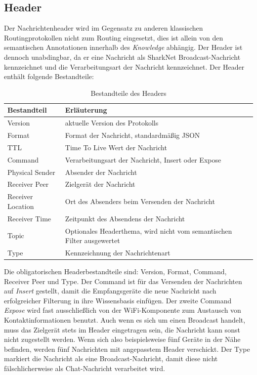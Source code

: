 \subsection{Header}
Der Nachrichtenheader wird im Gegensatz zu anderen klassischen Routingprotokollen nicht zum Routing eingesetzt, dies ist allein von den semantischen Annotationen innerhalb des \textit{Knowledge} abhängig. Der Header ist dennoch unabdingbar, da er eine Nachricht als SharkNet Broadcast-Nachricht kennzeichnet und die Verarbeitungsart der Nachricht kennzeichnet. Der Header enthält folgende Bestandteile:
\begin{table}[H]
	\begin{center}
		\caption{Bestandteile des Headers}
		\label{tab:messageHeader}
		\begin{tabular}{l|l} 			
			Bestandteil & Erläuterung \\
			\hline
			Version & aktuelle Version des Protokolls\\
			Format & Format der Nachricht, standardmäßig JSON\\
			TTL & Time To Live Wert der Nachricht\\
			Command & Verarbeitungsart der Nachricht, Insert oder Expose\\
			Physical Sender & Absender der Nachricht\\
			Receiver Peer & Zielgerät der Nachricht\\
			Receiver Location & Ort des Absenders beim Versenden der Nachricht\\
			Receiver Time & Zeitpunkt des Absendens der Nachricht\\
			Topic & Optionales Headerthema, wird nicht vom semantischen Filter ausgewertet\\
			Type & Kennzeichnung der Nachrichtenart\\							
		\end{tabular}
	\end{center}
\end{table}
Die obligatorischen Headerbestandteile sind: Version, Format, Command, Receiver Peer und Type. Der Command ist für das Versenden der Nachrichten auf \textit{Insert} gestellt, damit die Empfangsgeräte die neue Nachricht nach erfolgreicher Filterung in ihre Wissensbasis einfügen. Der zweite Command \textit{Expose} wird fast ausschließlich von der WiFi-Komponente zum Austausch von Kontaktinformationen benutzt. Auch wenn es sich um einen Broadcast handelt, muss das Zielgerät stets im Header eingetragen sein, die Nachricht kann sonst nicht zugestellt werden. Wenn sich also beispielsweise fünf Geräte in der Nähe befinden, werden fünf Nachrichten mit angepasstem Header verschickt. Der Type markiert die Nachricht als eine Broadcast-Nachricht, damit diese nicht fälschlicherweise als Chat-Nachricht verarbeitet wird.
